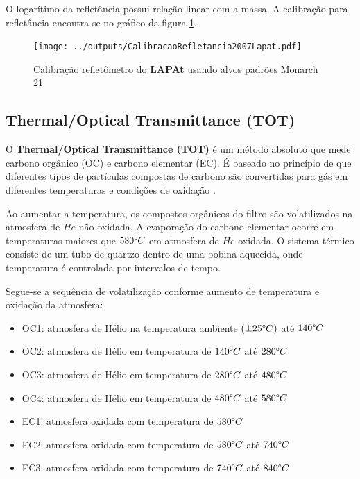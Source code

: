 O logarítimo da refletância possui relação linear com a massa.
A calibração para refletância encontra-se no gráfico da figura 
\ref{fig:mocarch21calib}. 

\begin{figure}[H]
  \centering
  \texttt{[image: ../outputs/CalibracaoRefletancia2007Lapat.pdf]}
  \caption{Calibração refletômetro do \textbf{LAPAt} usando alvos padrões Monarch 21
          \label{fig:mocarch21calib}}
\end{figure}

\subsection{Thermal/Optical Transmittance (TOT)}

O \textbf{Thermal/Optical Transmittance (TOT)} é um método absoluto
que mede carbono orgânico (OC) e carbono elementar (EC).
É baseado no princípio  de que diferentes tipos de partículas
compostas de carbono são convertidas para gás em diferentes temperaturas e condições
de oxidação \citep{birch1998}.

Ao aumentar a temperatura, os compostos orgânicos do filtro são volatilizados 
na atmosfera de $He$ não oxidada.
A evaporação do carbono elementar ocorre em temperaturas maiores que 
$580 \degree C$ em atmosfera de $He$ oxidada.
O sistema térmico consiste de um tubo de quartzo dentro de uma bobina aquecida, 
onde temperatura é controlada por intervalos de tempo.  

Segue-se a sequência de volatilização conforme aumento de temperatura e 
oxidação da atmosfera:

\begin{itemize}
  \item OC1: atmosfera de Hélio na temperatura ambiente $(\pm 25 \degree C)$ até $140 \degree C$
  \item OC2: atmosfera de Hélio em temperatura de $140 \degree C$ até $280 \degree C$
  \item OC3: atmosfera de Hélio em temperatura de $280 \degree C$ até $480 \degree C$
  \item OC4: atmosfera de Hélio em temperatura de $480 \degree C$ até $580 \degree C$
  \item EC1: atmosfera oxidada com temperatura de $580 \degree C$
  \item EC2: atmosfera oxidada com temperatura de $580 \degree C$ até $740 \degree C$
  \item EC3: atmosfera oxidada com temperatura de $740 \degree C$ até $840 \degree C$
\end{itemize}

